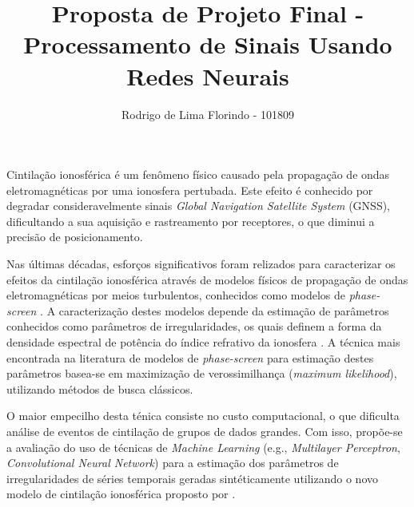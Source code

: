 \documentclass[11pt]{article}
\begin{document}
\author{Rodrigo de Lima Florindo - 101809}
\title{Proposta de Projeto Final - Processamento de Sinais Usando Redes Neurais}
\maketitle

Cintilação ionosférica é um fenômeno físico causado pela propagação de ondas eletromagnéticas por uma ionosfera pertubada. Este efeito é conhecido por degradar consideravelmente sinais \textit{Global Navigation Satellite System} (GNSS), dificultando a sua aquisição e rastreamento por receptores, o que diminui a precisão de posicionamento.

Nas últimas décadas, esforços significativos foram relizados para caracterizar os efeitos da cintilação ionosférica através de modelos físicos de propagação de ondas eletromagnéticas por meios turbulentos, conhecidos como modelos de \textit{phase-screen} \parencite{vasylyevModelingIonosphericScintillation2022}. A caracterização destes modelos depende da estimação de parâmetros conhecidos como parâmetros de irregularidades, os quais definem a forma da densidade espectral de potência do índice refrativo da ionosfera \cite{carranoLatitudinalLocalTime2012}. A técnica mais encontrada na literatura de modelos de \textit{phase-screen} para estimação destes parâmetros basea-se em maximização de verossimilhança (\textit{maximum likelihood}), utilizando métodos de busca clássicos.

O maior empecilho desta ténica consiste no custo computacional, o que dificulta análise de eventos de cintilação de grupos de dados grandes. Com isso, propõe-se a avaliação do uso de técnicas de \textit{Machine Learning} (e.g., \textit{Multilayer Perceptron}, \textit{Convolutional Neural Network}) para a estimação dos parâmetros de irregularidades de séries temporais geradas sintéticamente utilizando o novo modelo de cintilação ionosférica proposto por \textcite{rinoCompactMultifrequencyGNSS2018}.

\printbibliography
\end{document}
